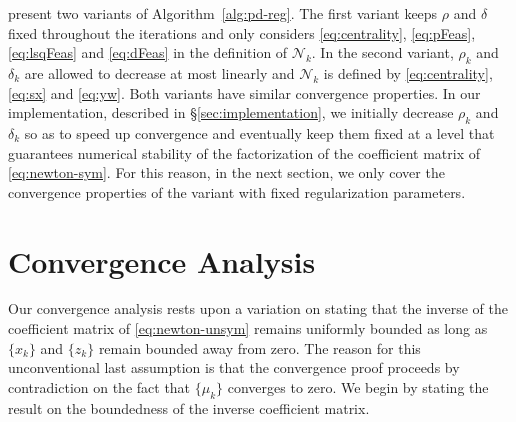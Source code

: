 \documentclass{amsart}
\begin{document}
\cite{friedlander-orban-2012} present two variants of
Algorithm~\ref{alg:pd-reg}. The first variant keeps $\rho$ and $\delta$ fixed
throughout the iterations and only considers \eqref{eq:centrality},
\eqref{eq:pFeas}, \eqref{eq:lsqFeas} and \eqref{eq:dFeas} in the definition of
$\mathcal{N}_k$. In the second variant, $\rho_k$ and $\delta_k$ are allowed to
decrease at most linearly and $\mathcal{N}_k$ is defined by
\eqref{eq:centrality}, \eqref{eq:sx} and \eqref{eq:yw}. Both variants have
similar convergence properties. In our implementation, described in
\S\ref{sec:implementation}, we initially decrease $\rho_k$ and $\delta_k$ so as
to speed up convergence and eventually keep them fixed at a level that
guarantees numerical stability of the factorization of the coefficient matrix
of \eqref{eq:newton-sym}. For this reason, in the next section, we only cover
the convergence properties of the variant with fixed regularization parameters.

\section{Convergence Analysis}

Our convergence analysis rests upon a variation on
\cite[Theorem~$1$]{armand-benoist-2011} stating that the inverse of the
coefficient matrix of \eqref{eq:newton-unsym} remains uniformly bounded as long
as $\{x_k\}$ and $\{z_k\}$ remain bounded away from zero. The reason for this
unconventional last assumption is that the convergence proof proceeds by
contradiction on the fact that $\{\mu_k\}$ converges to zero. We begin by
stating the result on the boundedness of the inverse coefficient matrix.
\end{document}
